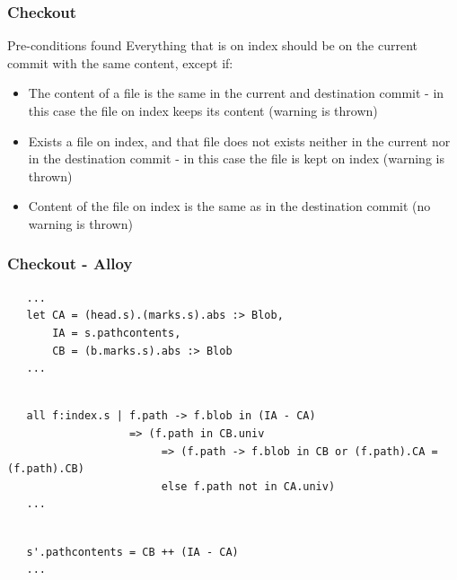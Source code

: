 \documentclass{beamer}
\begin{document}
\begin{frame}
   \frametitle{Checkout}
   \begin{block}{Pre-conditions found}
      Everything that is on index should be on the current commit with the
      same content, except if:
      \begin{itemize}
         \item The content of a file is the same in the
         current and destination commit - in this case
         the file on index keeps its content (warning is thrown)
         \item Exists a file on index, and that file does not exists
         neither in the current nor in the destination commit - in
         this case the file is kept on index (warning is thrown)
         \item Content of the file on index is the same as in the
         destination commit (no warning is thrown)
      \end{itemize}
   \end{block}
\end{frame}

\begin{frame}[fragile]
   \frametitle{Checkout - Alloy}
	\tiny
	\begin{lstlisting}
   ...
   let CA = (head.s).(marks.s).abs :> Blob, 
       IA = s.pathcontents,
       CB = (b.marks.s).abs :> Blob
   ...
	\end{lstlisting}
   \pause
	\begin{lstlisting}
   
   all f:index.s | f.path -> f.blob in (IA - CA) 
                   => (f.path in CB.univ 
                        => (f.path -> f.blob in CB or (f.path).CA = (f.path).CB)
                        else f.path not in CA.univ)
   ...
	\end{lstlisting}
   \pause
	\begin{lstlisting}
   
   s'.pathcontents = CB ++ (IA - CA)
   ...
   \end{lstlisting}
\end{frame}
\end{document}
